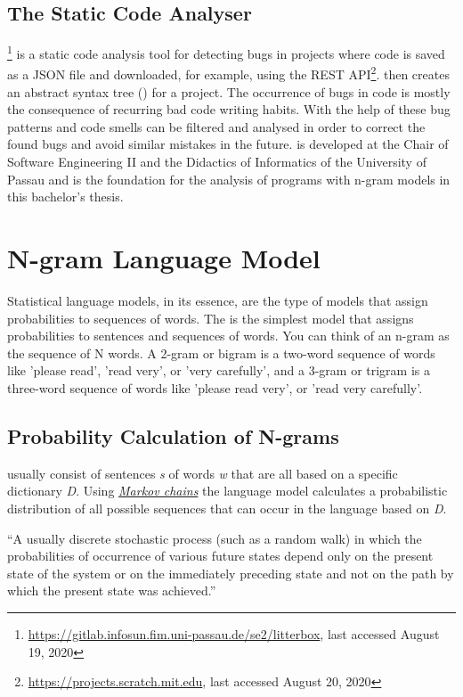 \subsection{The Static \scratch{} Code Analyser \litterbox{}}\label{subsec:litterbox}
\litterbox{}\footnote{\url{https://gitlab.infosun.fim.uni-passau.de/se2/litterbox}, last accessed August 19, 2020} is a static code analysis tool for detecting bugs in \scratch{} projects where \scratch{} code is saved as a JSON file and downloaded, for example, using the \scratch{} REST API\footnote{\url{https://projects.scratch.mit.edu}, last accessed August 20, 2020}. \litterbox{} then creates an abstract syntax tree (\AST{}) for a \scratch{} project. The occurrence of bugs in code is mostly the consequence of recurring bad code writing habits. With the help of \litterbox{} these bug patterns and code smells can be filtered and analysed in order to correct the found bugs and avoid similar mistakes in the future. \litterbox{} is developed at the Chair of Software Engineering II and the Didactics of Informatics of the University of Passau and is the foundation for the analysis of \scratch{} programs with n-gram models in this bachelor's thesis. 


\section{N-gram Language Model}\label{sec:language-models}
Statistical language models, in its essence, are the type of models that assign probabilities to sequences of words. The \ngram{} is the simplest model that assigns probabilities to sentences and sequences of words. You can think of an n-gram as the sequence of N words. A 2-gram or bigram is a two-word sequence of words like 'please read', 'read very', or 'very carefully', and a 3-gram or trigram is a three-word sequence of words like 'please read very', or 'read very carefully'. 

\subsection{Probability Calculation of N-grams}\label{subsec:ngram}
 usually consist of sentences \textit{s} of words \textit{w} that are all based on a specific dictionary \textit{D}. Using \hyperref[def:markov_chain]{\textit{Markov chains}} the language model calculates a probabilistic distribution of all possible sequences that can occur in the language based on \textit{D}.

\begin{definition}\label{def:markov_chain}
    ``A usually discrete stochastic process (such as a random walk) in which the probabilities of occurrence of various future states depend only on the present state of the system or on the immediately preceding state and not on the path by which the present state was achieved.''~\cite{markov_chain}
\end{definition} 

